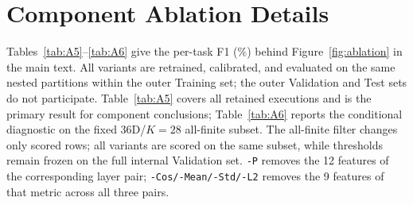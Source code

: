 \section{Component Ablation Details}
\label{app:ablation}

Tables~\ref{tab:A5}--\ref{tab:A6} give the per-task F1 (\%) behind Figure~\ref{fig:ablation} in the main text. All variants are retrained, calibrated, and evaluated on the same nested partitions within the outer Training set; the outer Validation and Test sets do not participate. Table~\ref{tab:A5} covers all retained executions and is the primary result for component conclusions; Table~\ref{tab:A6} reports the conditional diagnostic on the fixed 36D/$K{=}28$ all-finite subset. The all-finite filter changes only scored rows; all variants are scored on the same subset, while thresholds remain frozen on the full internal Validation set. \texttt{-P} removes the 12 features of the corresponding layer pair; \texttt{-Cos/-Mean/-Std/-L2} removes the 9 features of that metric across all three pairs.

\begin{table}[!ht]
\caption{Per-task component ablation, Significant-SDC F1 on all retained executions (\%).}
\label{tab:A5}
\centering
\small
{}
\end{table}

